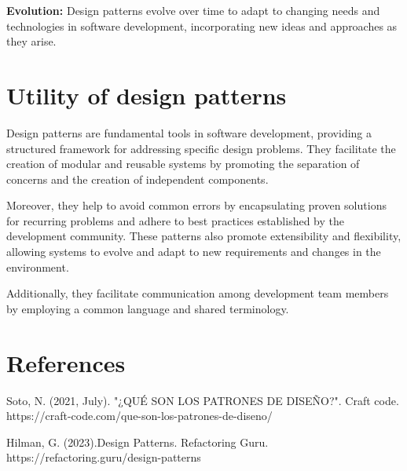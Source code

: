 \documentclass{article}
\begin{document}
\begin{multicols}{2}
		\textbf{Evolution:} Design patterns evolve over time to adapt to changing needs and technologies in software development, incorporating new ideas and approaches as they arise.
		
		\section{Utility of design patterns}
		Design patterns are fundamental tools in software development, providing a structured framework for addressing specific design problems. They facilitate the creation of modular and reusable systems by promoting the separation of concerns and the creation of independent components.
		
		Moreover, they help to avoid common errors by encapsulating proven solutions for recurring problems and adhere to best practices established by the development community. These patterns also promote extensibility and flexibility, allowing systems to evolve and adapt to new requirements and changes in the environment.
		
		Additionally, they facilitate communication among development team members by employing a common language and shared terminology.
		
		
	\end{multicols} 
	\section{References}
	
	Soto, N. (2021, July). "¿QUÉ SON LOS PATRONES DE DISEÑO?". Craft code. 
	https://craft-code.com/que-son-los-patrones-de-diseno/
	
	
	Hilman, G. (2023).Design Patterns. Refactoring Guru.
	https://refactoring.guru/design-patterns
	
\end{document}
